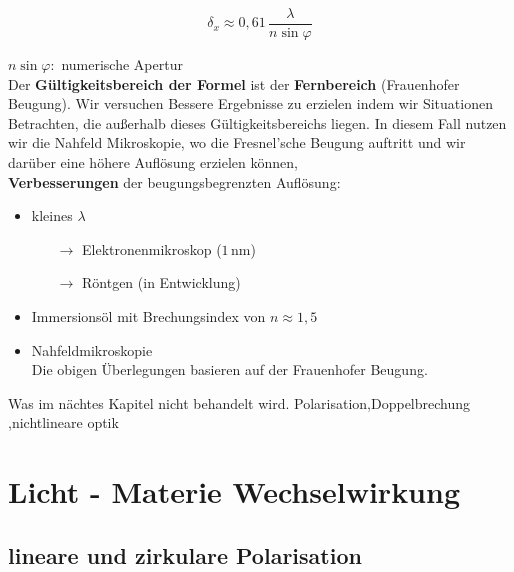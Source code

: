 \documentclass[titlepage,11pt,a4paper,ngerman]{report}
\newcommand{\tx}[1]{\textrm{#1}}
\newcommand{\lcom}[1]{\color{MidnightBlue}#1\color{black}}
\newcommand{\frbox}[2]{\begin{tcolorbox}[colback=white,colframe=red!75!black,fonttitle=\bfseries,title=#1]#2\end{tcolorbox}}
\begin{document}
\begin{center}
	\begin{minipage}{.5\linewidth}
		\frbox{Auflösung eines Mikroskop}{
		\begin{equation*}
		\delta_x \approx 0{,}61 \, \frac{\lambda}{n \sin\varphi}
		\end{equation*}	
		}
	\end{minipage}
\end{center}
$ n \sin \varphi : $ numerische Apertur\\
\lcom{Der \textbf{Gültigkeitsbereich der Formel} ist der \textbf{Fernbereich} (Frauenhofer Beugung). Wir versuchen Bessere Ergebnisse zu erzielen indem wir Situationen Betrachten, die außerhalb dieses Gültigkeitsbereichs liegen. In diesem Fall nutzen wir die Nahfeld Mikroskopie, wo die Fresnel'sche Beugung auftritt und wir darüber eine höhere Auflösung erzielen können,}\\[5pt]
\textbf{Verbesserungen} der beugungsbegrenzten Auflösung:
\begin{itemize}
	\item kleines $ \lambda $
	\begin{itemize}
		\item[$ \rightarrow $] Elektronenmikroskop ($ 1 \, \tx{nm} $)
		\item[$ \rightarrow $] Röntgen (in Entwicklung)
	\end{itemize}
	\item Immersionsöl mit Brechungsindex von $ n \approx 1{,}5 $
	\item Nahfeldmikroskopie\\
	Die obigen Überlegungen basieren auf der Frauenhofer Beugung.
\end{itemize}

\noindent
\lcom{Was im nächtes Kapitel nicht behandelt wird. Polarisation,Doppelbrechung ,nichtlineare optik}

\chapter{Licht - Materie Wechselwirkung}

\section{lineare und zirkulare Polarisation}
\end{document}
